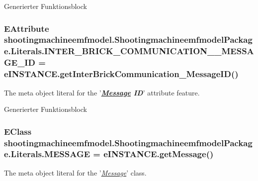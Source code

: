 Generierter Funktionsblock \hypertarget{interfaceshootingmachineemfmodel_1_1_shootingmachineemfmodel_package_1_1_literals_a7f8c5b876efa409144b3f78f77678e1a}{
\subsubsection[{I\-N\-T\-E\-R\-\_\-\-B\-R\-I\-C\-K\-\_\-\-C\-O\-M\-M\-U\-N\-I\-C\-A\-T\-I\-O\-N\-\_\-\-\_\-\-M\-E\-S\-S\-A\-G\-E\-\_\-\-I\-D}]{\setlength{\rightskip}{0pt plus 5cm}E\-Attribute shootingmachineemfmodel.\-Shootingmachineemfmodel\-Package.\-Literals.\-I\-N\-T\-E\-R\-\_\-\-B\-R\-I\-C\-K\-\_\-\-C\-O\-M\-M\-U\-N\-I\-C\-A\-T\-I\-O\-N\-\_\-\-\_\-\-M\-E\-S\-S\-A\-G\-E\-\_\-\-I\-D = e\-I\-N\-S\-T\-A\-N\-C\-E.\-get\-Inter\-Brick\-Communication\-\_\-\-Message\-I\-D()}}\label{interfaceshootingmachineemfmodel_1_1_shootingmachineemfmodel_package_1_1_literals_a7f8c5b876efa409144b3f78f77678e1a}
The meta object literal for the '{\itshape {\bfseries \hyperlink{interfaceshootingmachineemfmodel_1_1_message}{Message} I\-D}}' attribute feature.

Generierter Funktionsblock \hypertarget{interfaceshootingmachineemfmodel_1_1_shootingmachineemfmodel_package_1_1_literals_ab0be4348efbb58889f96804263c8b934}{
\subsubsection[{M\-E\-S\-S\-A\-G\-E}]{\setlength{\rightskip}{0pt plus 5cm}E\-Class shootingmachineemfmodel.\-Shootingmachineemfmodel\-Package.\-Literals.\-M\-E\-S\-S\-A\-G\-E = e\-I\-N\-S\-T\-A\-N\-C\-E.\-get\-Message()}}\label{interfaceshootingmachineemfmodel_1_1_shootingmachineemfmodel_package_1_1_literals_ab0be4348efbb58889f96804263c8b934}
The meta object literal for the '\hyperlink{classshootingmachineemfmodel_1_1impl_1_1_message_impl}{{\itshape Message}}' class.

